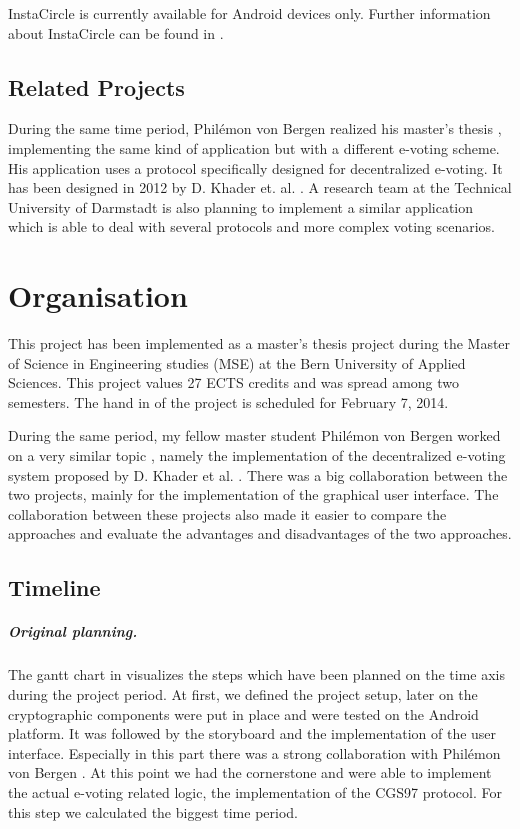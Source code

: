 \documentclass[numbers=noenddot, abstract=on, a4paper, headsepline,
footsepline, oneside, openright, draft=off, listof=leveldown]{scrreprt}
\begin{document}
InstaCircle is currently available for Android devices only. Further information
about InstaCircle can be found in \cite{ritter13a}.

\section{Related Projects}
During the same time period, Philémon von Bergen realized his master's thesis
\cite{vonBergen14}, implementing the same kind of application but with a
different e-voting scheme. His application uses a protocol specifically designed
for decentralized e-voting. It has been designed in 2012 by D. Khader et. al.
\cite{HKRS12}. A research team at the Technical University of Darmstadt is also
planning to implement a similar application which is able to deal with several
protocols and more complex voting scenarios.

\chapter{Organisation}
\label{cha:organisation}
This project has been implemented as a master's thesis project during the
Master of Science in Engineering studies (MSE) at the Bern University of Applied
Sciences. This project values 27 ECTS credits and was spread among two
semesters.
The hand in of the project is scheduled for February 7, 2014.

During the same period, my fellow master student Philémon von Bergen worked on a
very similar topic \cite{vonBergen14}, namely the implementation of the
decentralized e-voting system proposed by D. Khader et al. \cite{HKRS12}. There
was a big collaboration between the two projects, mainly for the implementation
of the graphical user interface. The collaboration between these projects also
made it easier to compare the approaches and evaluate the advantages and
disadvantages of the two approaches.

\section{Timeline}
\label{sec:planning}
\paragraph{Original planning.} The gantt chart in 
visualizes the steps which have been planned on the time axis during the project period. At first, we
defined the project setup, later on the cryptographic components were put in
place and were tested on the Android platform. It was followed by the storyboard
and the implementation of the user interface. Especially in this part there was
a strong collaboration with Philémon von Bergen \cite{vonBergen14}. At this point
we had the cornerstone and were able to implement the actual e-voting related
logic, the implementation of the CGS97 protocol. For this step we calculated the
biggest time period.
\end{document}
